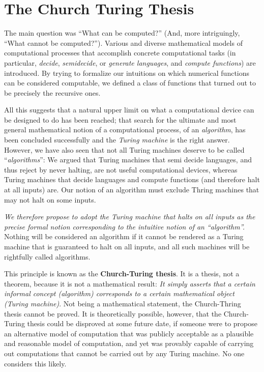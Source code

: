 \section{The Church Turing Thesis}
\label{sec:church-turing-thesis}

The main question was ``What can be computed?'' (And, more intriguingly, ``What cannot be computed?''). Various and diverse 
mathematical models of computational processes that accomplish concrete computational tasks (in particular, \textit{decide}, \textit{semidecide}, or \textit{generate languages}, and \textit{compute functions}) are introduced. By trying to formalize our intuitions on which numerical functions can be considered computable, we defined a class of functions that turned out to be precisely the recursive ones. 

All this suggests that a natural upper limit on what a computational device can be designed to do has been reached; that search for the ultimate and most general mathematical notion of a computational process, of an \textit{algorithm}, has been concluded successfully and the \textit{Turing machine} is the right answer. However, we have also seen that not all Turing machines deserve to be called ``\textit{algorithms}'': We argued that Turing machines that semi decide languages, and thus reject by never halting, are not useful computational devices, whereas Turing machines that decide languages and compute functions (and therefore halt at all inputs) are. Our notion of an algorithm must exclude Thring machines that may not halt on some inputs.

\textit{We therefore propose to adopt the Turing machine that halts on all inputs as the precise formal notion corresponding to the intuitive notion of an ``algorithm''.} Nothing will be considered an algorithm if it cannot be rendered as a Turing machine that is guaranteed to halt on all inputs, and all such machines will be rightfully called algorithms.

This principle is known as the \textbf{Church-Turing thesis}. It is a thesis, not a theorem, because it is not a mathematical 
result: \textit{It simply asserts that a certain informal concept (algorithm) corresponds to a certain mathematical object (Turing machine)}. Not being a mathematical statement, the Church-Thring thesis cannot be proved. It is theoretically possible, however, that the Church-Turing thesis could be disproved at some future date, if someone were to propose an alternative model of computation that was publicly acceptable as a plausible and reasonable model of computation, and yet was provably capable of carrying out computations that cannot be carried out by any Turing machine. No one considers this likely.

